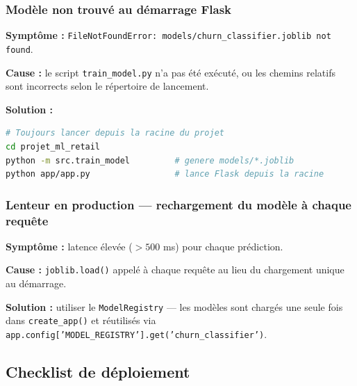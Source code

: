 \documentclass[11pt,a4paper]{article}
\begin{document}
\subsubsection{Modèle non trouvé au démarrage Flask}

\textbf{Symptôme :} \texttt{FileNotFoundError: models/churn\_classifier.joblib not found}.

\textbf{Cause :} le script \texttt{train\_model.py} n'a pas été exécuté, ou les chemins relatifs sont incorrects selon le répertoire de lancement.

\textbf{Solution :}
\begin{lstlisting}[language=bash, numbers=none]
# Toujours lancer depuis la racine du projet
cd projet_ml_retail
python -m src.train_model         # genere models/*.joblib
python app/app.py                 # lance Flask depuis la racine
\end{lstlisting}

\subsubsection{Lenteur en production — rechargement du modèle à chaque requête}

\textbf{Symptôme :} latence élevée ($> 500$ ms) pour chaque prédiction.

\textbf{Cause :} \texttt{joblib.load()} appelé à chaque requête au lieu du chargement unique au démarrage.

\textbf{Solution :} utiliser le \texttt{ModelRegistry} — les modèles sont chargés une seule fois dans \texttt{create\_app()} et réutilisés via \texttt{app.config['MODEL\_REGISTRY'].get('churn\_classifier')}.

\subsection{Checklist de déploiement}
\end{document}
